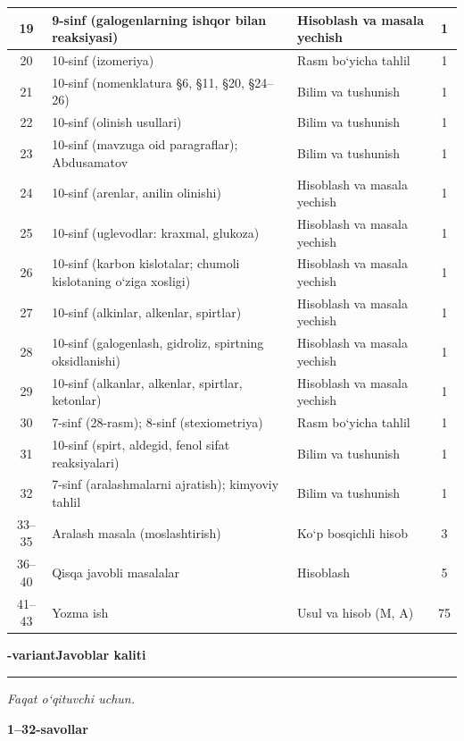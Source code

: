 \documentclass[11pt,a4paper]{article}
\newcommand{\hdrpill}[1]{\begin{tikzpicture}[baseline=0pt]\node[fill=ygreen,text=white,rounded corners=8pt,inner xsep=10pt,inner ysep=5pt,font=\fontsize{13}{15}\bfseries\selectfont] at (0,0.475){#1};\end{tikzpicture}}
\newcommand{\curvar}{}\fancyhead[R]{\hdrpill{\curvar}}
\begin{document}
{\begin{longtable}{|c|p{7.2cm}|p{5.4cm}|c|}
19 & 9-sinf (galogenlarning ishqor bilan reaksiyasi) & Hisoblash va masala yechish & 1\\\hline
20 & 10-sinf (izomeriya) & Rasm bo`yicha tahlil & 1\\\hline
21 & 10-sinf (nomenklatura \S{}6, \S{}11, \S{}20, \S{}24--26) & Bilim va tushunish & 1\\\hline
22 & 10-sinf (olinish usullari) & Bilim va tushunish & 1\\\hline
23 & 10-sinf (mavzuga oid paragraflar); Abdusamatov & Bilim va tushunish & 1\\\hline
24 & 10-sinf (arenlar, anilin olinishi) & Hisoblash va masala yechish & 1\\\hline
25 & 10-sinf (uglevodlar: kraxmal, glukoza) & Hisoblash va masala yechish & 1\\\hline
26 & 10-sinf (karbon kislotalar; chumoli kislotaning o`ziga xosligi) & Hisoblash va masala yechish & 1\\\hline
27 & 10-sinf (alkinlar, alkenlar, spirtlar) & Hisoblash va masala yechish & 1\\\hline
28 & 10-sinf (galogenlash, gidroliz, spirtning oksidlanishi) & Hisoblash va masala yechish & 1\\\hline
29 & 10-sinf (alkanlar, alkenlar, spirtlar, ketonlar) & Hisoblash va masala yechish & 1\\\hline
30 & 7-sinf (28-rasm); 8-sinf (stexiometriya) & Rasm bo`yicha tahlil & 1\\\hline
31 & 10-sinf (spirt, aldegid, fenol sifat reaksiyalari) & Bilim va tushunish & 1\\\hline
32 & 7-sinf (aralashmalarni ajratish); kimyoviy tahlil & Bilim va tushunish & 1\\\hline
33--35 & Aralash masala (moslashtirish) & Ko`p bosqichli hisob & 3\\\hline
36--40 & Qisqa javobli masalalar & Hisoblash & 5\\\hline
41--43 & Yozma ish & Usul va hisob (M, A) & 75\\\hline
\end{longtable}}
\renewcommand{\curvar}{Javoblar}
\newpage
\noindent\textbf{\fontsize{13}{15}-variant}\hfill \textbf{Javoblar kaliti}\par\smallskip\hrule\smallskip
\textit{Faqat o`qituvchi uchun.}\par\medskip
\noindent\textbf{1--32-savollar}\par\smallskip
\end{document}
